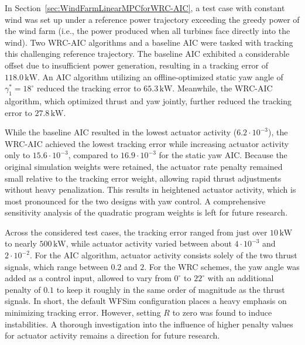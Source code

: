 In Section~\ref{sec:WindFarmLinearMPCforWRC-AIC}, a test case with constant wind was set up under a reference power trajectory exceeding the greedy power of the wind farm (i.e., the power produced when all turbines face directly into the wind). Two WRC-AIC algorithms and a baseline AIC were tasked with tracking this challenging reference trajectory. The baseline AIC exhibited a considerable offset due to insufficient power generation, resulting in a tracking error of $118.0\,\text{kW}$. An AIC algorithm utilizing an offline-optimized static yaw angle of $\gamma_1^* = 18^\circ$ reduced the tracking error to $65.3\,\text{kW}$. Meanwhile, the WRC-AIC algorithm, which optimized thrust and yaw jointly, further reduced the tracking error to $27.8\,\text{kW}$. 

While the baseline AIC resulted in the lowest actuator activity ($6.2 \cdot 10^{-3}$), the WRC-AIC achieved the lowest tracking error while increasing actuator activity only to $15.6 \cdot 10^{-3}$, compared to $16.9 \cdot 10^{-3}$ for the static yaw AIC. Because the original simulation weights were retained, the actuator rate penalty remained small relative to the tracking error weight, allowing rapid thrust adjustments without heavy penalization. This results in heightened actuator activity, which is most pronounced for the two designs with yaw control. A comprehensive sensitivity analysis of the quadratic program weights is left for future research.

Across the considered test cases, the tracking error ranged from just over $10\,\text{kW}$ to nearly $500\,\text{kW}$, while actuator activity varied between about $4 \cdot 10^{-3}$ and $2 \cdot 10^{-2}$. For the AIC algorithm, actuator activity consists solely of the two thrust signals, which range between $0.2$ and $2$. For the WRC schemes, the yaw angle was added as a control input, allowed to vary from $0^\circ$ to $22^\circ$ with an additional penalty of $0.1$ to keep it roughly in the same order of magnitude as the thrust signals. In short, the default WFSim configuration places a heavy emphasis on minimizing tracking error. However, setting $R$ to zero was found to induce instabilities. A thorough investigation into the influence of higher penalty values for actuator activity remains a direction for future research.

